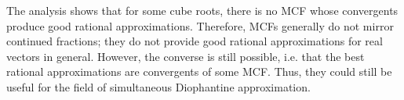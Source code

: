 

The analysis shows that for some cube roots,
there is no MCF whose convergents produce good rational approximations.
Therefore, MCFs generally do not mirror continued fractions;
they do not provide good rational approximations for real vectors in general.
However, the converse is still possible, i.e. that the best rational
approximations are convergents of some MCF.
Thus, they could still be useful for the field of simultaneous Diophantine
approximation.
